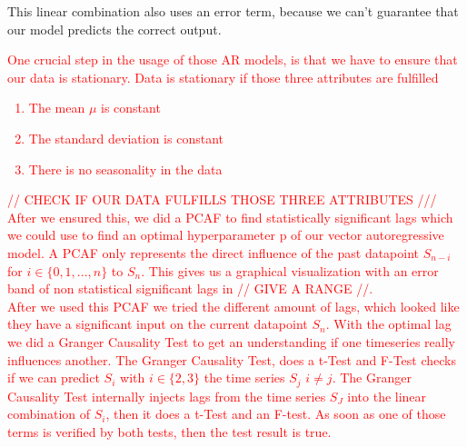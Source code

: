\documentclass{article}
\theoremstyle{plain}
\theoremstyle{definition}
\theoremstyle{remark}
\begin{document}
This linear combination also uses an error term, because we can't guarantee that our model predicts the correct output.\\
\textcolor{red}{One crucial step in the usage of those AR models, is that we have to ensure that our data is stationary. 
Data is stationary if those three attributes are fulfilled
\begin{enumerate}
    \item The mean $\mu$ is constant
    \item The standard deviation is constant
    \item There is no seasonality in the data
\end{enumerate}
// CHECK IF OUR DATA FULFILLS THOSE THREE ATTRIBUTES ///\\
After we ensured this, we did a PCAF to find statistically significant lags which we could use to find an optimal hyperparameter p of our vector autoregressive model.
A PCAF only represents the direct influence of the past datapoint $S_{n-i}$ for $i \in \{0,1,...,n\}$  to $S_n$. This gives us a graphical visualization with an error band of non statistical significant
lags in // GIVE A RANGE //.\\
After we used this PCAF we tried the different amount of lags, which looked like they have a significant input on the current datapoint $S_n$.
With the optimal lag we did a Granger Causality Test to get an understanding if one timeseries really influences another. The Granger Causality Test, does a t-Test and F-Test
checks if we can predict $S_i$ with $i \in \{2,3\}$ the time series $S_j$ $i\neq j$. The Granger Causality Test internally injects lags from the time series $S_J$ 
into the linear combination of $S_i$, then it does a t-Test and an F-test. As soon as one of those terms is verified by both tests,
then the test result is true.
}





% 
\end{document}
